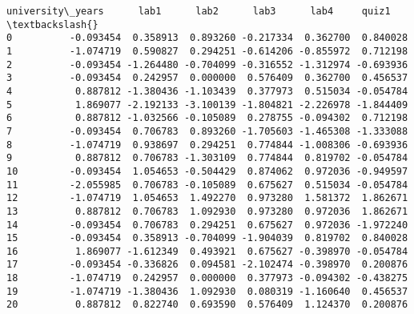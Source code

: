 \documentclass[11pt]{article}
\makeatletter
\newcommand{\boxspacing}{\kern\kvtcb@left@rule\kern\kvtcb@boxsep}
\newcommand{\prompt}[4]{
        {\ttfamily\llap{{\color{#2}[#3]:\hspace{3pt}#4}}\vspace{-\baselineskip}}
    }
\makeatother
\begin{document}
            \begin{tcolorbox}[breakable, size=fbox, boxrule=.5pt, pad at break*=1mm, opacityfill=0]
\prompt{Out}{outcolor}{46}{\boxspacing}
\begin{Verbatim}[commandchars=\\\{\}]
    university\_years      lab1      lab2      lab3      lab4     quiz1  \textbackslash{}
0          -0.093454  0.358913  0.893260 -0.217334  0.362700  0.840028
1          -1.074719  0.590827  0.294251 -0.614206 -0.855972  0.712198
2          -0.093454 -1.264480 -0.704099 -0.316552 -1.312974 -0.693936
3          -0.093454  0.242957  0.000000  0.576409  0.362700  0.456537
4           0.887812 -1.380436 -1.103439  0.377973  0.515034 -0.054784
5           1.869077 -2.192133 -3.100139 -1.804821 -2.226978 -1.844409
6           0.887812 -1.032566 -0.105089  0.278755 -0.094302  0.712198
7          -0.093454  0.706783  0.893260 -1.705603 -1.465308 -1.333088
8          -1.074719  0.938697  0.294251  0.774844 -1.008306 -0.693936
9           0.887812  0.706783 -1.303109  0.774844  0.819702 -0.054784
10         -0.093454  1.054653 -0.504429  0.874062  0.972036 -0.949597
11         -2.055985  0.706783 -0.105089  0.675627  0.515034 -0.054784
12         -1.074719  1.054653  1.492270  0.973280  1.581372  1.862671
13          0.887812  0.706783  1.092930  0.973280  0.972036  1.862671
14         -0.093454  0.706783  0.294251  0.675627  0.972036 -1.972240
15         -0.093454  0.358913 -0.704099 -1.904039  0.819702  0.840028
16          1.869077 -1.612349  0.493921  0.675627 -0.398970 -0.054784
17         -0.093454 -0.336826  0.094581 -2.102474 -0.398970  0.200876
18         -1.074719  0.242957  0.000000  0.377973 -0.094302 -0.438275
19         -1.074719 -1.380436  1.092930  0.080319 -1.160640  0.456537
20          0.887812  0.822740  0.693590  0.576409  1.124370  0.200876


\end{Verbatim}
\end{tcolorbox}
\end{document}
